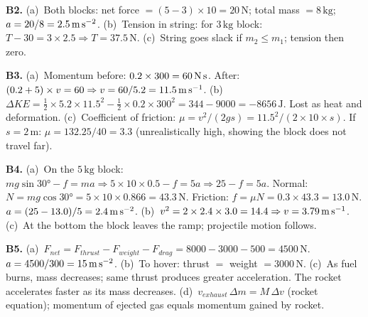 \textbf{B2.}
(a)~Both blocks: net force $=(5-3)\times10=20\,\text{N}$;
total mass $=8\,\text{kg}$; $a=20/8=2.5\,\text{m\,s}^{-2}$. \quad
(b)~Tension in string: for $3\,\text{kg}$ block:
$T-30=3\times2.5\Rightarrow T=37.5\,\text{N}$. \quad
(c)~String goes slack if $m_2\leq m_1$; tension then
zero.

\textbf{B3.}
(a)~Momentum before: $0.2\times300=60\,\text{N\,s}$.
After: $(0.2+5)\times v=60\Rightarrow v=60/5.2
=11.5\,\text{m\,s}^{-1}$. \quad
(b)~$\Delta KE=\tfrac{1}{2}\times5.2\times11.5^2
-\tfrac{1}{2}\times0.2\times300^2=344-9000=-8656\,\text{J}$.
Lost as heat and deformation. \quad
(c)~Coefficient of friction: $\mu=v^2/(2gs)=11.5^2/(2\times10\times s)$.
If $s=2\,\text{m}$: $\mu=132.25/40=3.3$ (unrealistically
high, showing the block does not travel far).

\textbf{B4.}
(a)~On the $5\,\text{kg}$ block:
$mg\sin30°-f=ma\Rightarrow5\times10\times0.5-f=5a
\Rightarrow25-f=5a$.
Normal: $N=mg\cos30°=5\times10\times0.866=43.3\,\text{N}$.
Friction: $f=\mu N=0.3\times43.3=13.0\,\text{N}$.
$a=(25-13.0)/5=2.4\,\text{m\,s}^{-2}$. \quad
(b)~$v^2=2\times2.4\times3.0=14.4\Rightarrow v=3.79\,\text{m\,s}^{-1}$.
\quad
(c)~At the bottom the block leaves the ramp; projectile
motion follows.

\textbf{B5.}
(a)~$F_{net}=F_{thrust}-F_{weight}-F_{drag}
=8000-3000-500=4500\,\text{N}$.
$a=4500/300=15\,\text{m\,s}^{-2}$. \quad
(b)~To hover: thrust $=$ weight $=3000\,\text{N}$. \quad
(c)~As fuel burns, mass decreases; same thrust produces
greater acceleration. The rocket accelerates faster
as its mass decreases. \quad
(d)~$v_{exhaust}\,\Delta m=M\,\Delta v$ (rocket equation);
momentum of ejected gas equals momentum gained by rocket.

\endgroup


